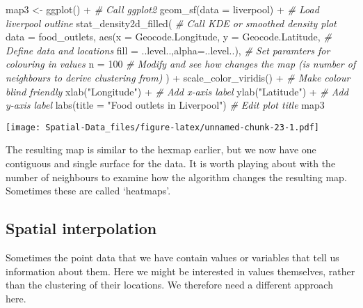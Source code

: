 \documentclass[
]{book}
\newenvironment{Shaded}{\begin{snugshade}}{\end{snugshade}}
\newcommand{\AttributeTok}[1]{\textcolor[rgb]{0.77,0.63,0.00}{#1}}
\newcommand{\CommentTok}[1]{\textcolor[rgb]{0.56,0.35,0.01}{\textit{#1}}}
\newcommand{\DecValTok}[1]{\textcolor[rgb]{0.00,0.00,0.81}{#1}}
\newcommand{\FunctionTok}[1]{\textcolor[rgb]{0.00,0.00,0.00}{#1}}
\newcommand{\NormalTok}[1]{#1}
\newcommand{\OtherTok}[1]{\textcolor[rgb]{0.56,0.35,0.01}{#1}}
\newcommand{\SpecialCharTok}[1]{\textcolor[rgb]{0.00,0.00,0.00}{#1}}
\newcommand{\StringTok}[1]{\textcolor[rgb]{0.31,0.60,0.02}{#1}}
\begin{document}
\begin{Shaded}
\begin{Highlighting}[]
\NormalTok{map3 }\OtherTok{\textless{}{-}} \FunctionTok{ggplot}\NormalTok{() }\SpecialCharTok{+} \CommentTok{\# Call ggplot2}
    \FunctionTok{geom\_sf}\NormalTok{(}\AttributeTok{data =}\NormalTok{ liverpool) }\SpecialCharTok{+} \CommentTok{\# Load liverpool outline}
    \FunctionTok{stat\_density2d\_filled}\NormalTok{( }\CommentTok{\# Call KDE or smoothed density plot}
        \AttributeTok{data =}\NormalTok{ food\_outlets, }\FunctionTok{aes}\NormalTok{(}\AttributeTok{x =}\NormalTok{ Geocode.Longitude, }\AttributeTok{y =}\NormalTok{ Geocode.Latitude, }\CommentTok{\# Define data and locations}
                                 \AttributeTok{fill =}\NormalTok{ ..level..,}\AttributeTok{alpha=}\NormalTok{..level..), }\CommentTok{\# Set paramters for colouring in values}
        \AttributeTok{n =} \DecValTok{100} \CommentTok{\# Modify and see how changes the map (is number of neighbours to derive clustering from)}
\NormalTok{    ) }\SpecialCharTok{+}
    \FunctionTok{scale\_color\_viridis}\NormalTok{() }\SpecialCharTok{+} \CommentTok{\# Make colour blind friendly}
    \FunctionTok{xlab}\NormalTok{(}\StringTok{"Longitude"}\NormalTok{) }\SpecialCharTok{+} \CommentTok{\# Add x{-}axis label}
    \FunctionTok{ylab}\NormalTok{(}\StringTok{"Latitude"}\NormalTok{) }\SpecialCharTok{+} \CommentTok{\# Add y{-}axis label}
    \FunctionTok{labs}\NormalTok{(}\AttributeTok{title =} \StringTok{"Food outlets in Liverpool"}\NormalTok{) }\CommentTok{\# Edit plot title}
\NormalTok{map3}
\end{Highlighting}
\end{Shaded}

\texttt{[image: Spatial-Data\_files/figure-latex/unnamed-chunk-23-1.pdf]}

The resulting map is similar to the hexmap earlier, but we now have one contiguous and single surface for the data. It is worth playing about with the number of neighbours to examine how the algorithm changes the resulting map. Sometimes these are called `heatmaps'.

\hypertarget{spatial-interpolation}{%
\subsection{Spatial interpolation}\label{spatial-interpolation}}

Sometimes the point data that we have contain values or variables that tell us information about them. Here we might be interested in values themselves, rather than the clustering of their locations. We therefore need a different approach here.
\end{document}
